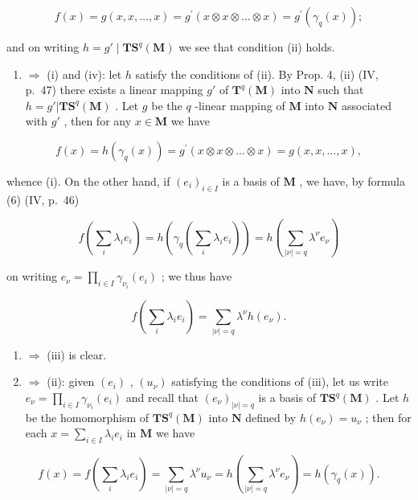\[
f (x) = g (x, x, \dots , x) = g ^ {\prime} (x \otimes x \otimes \dots \otimes x) = g ^ {\prime} (\gamma_ {q} (x));
\]

and on writing \(h = g' \mid \mathbf{TS}^q(\mathbf{M})\) we see that condition (ii) holds.

\begin{enumerate}
\def\labelenumi{(\roman{enumi})}
\setcounter{enumi}{1}
\tightlist
\item
  \(\Rightarrow\) (i) and (iv): let \(h\) satisfy the conditions of (ii). By Prop. 4, (ii) (IV, p.~47) there exists a linear mapping \(g'\) of \(\mathbf{T}^q (\mathbf{M})\) into \(\mathbf{N}\) such that \(h = g'|\mathbf{TS}^q (\mathbf{M})\) . Let \(g\) be the \(q\) -linear mapping of \(\mathbf{M}\) into \(\mathbf{N}\) associated with \(g'\) , then for any \(x\in \mathbf{M}\) we have
\end{enumerate}

\[
f (x) = h \left(\gamma_ {q} (x)\right) = g ^ {\prime} (x \otimes x \otimes \dots \otimes x) = g (x, x, \dots , x),
\]

whence (i). On the other hand, if \((e_i)_{i\in I}\) is a basis of \(\mathbf{M}\) , we have, by formula (6) (IV, p.~46)

\[
f \left(\sum_ {i} \lambda_ {i} e _ {i}\right) = h \left(\gamma_ {q} \left(\sum_ {i} \lambda_ {i} e _ {i}\right)\right) = h \left(\sum_ {| \nu | = q} \lambda^ {\nu} e _ {\nu}\right)
\]

on writing \(e_{\nu} = \prod_{i\in I}\gamma_{\nu_i}(e_i)\) ; we thus have

\[
f \left(\sum_ {i} \lambda_ {i} e _ {i}\right) = \sum_ {| \nu | = q} \lambda^ {\nu} h \left(e _ {\nu}\right).
\]

\begin{enumerate}
\def\labelenumi{(\roman{enumi})}
\setcounter{enumi}{3}
\item
  \(\Rightarrow\) (iii) is clear.
\item
  \(\Rightarrow\) (ii): given \((e_i)\) , \((u_\nu)\) satisfying the conditions of (iii), let us write \(e_\nu = \prod_{i\in I}\gamma_{\nu_i}(e_i)\) and recall that \((e_\nu)_{|\nu| = q}\) is a basis of \(\mathbf{TS}^q (\mathbf{M})\) . Let \(h\) be the homomorphism of \(\mathbf{TS}^q (\mathbf{M})\) into \(\mathbf{N}\) defined by \(h(e_{\nu}) = u_{\nu}\) ; then for each \(x = \sum_{i\in I}\lambda_i e_i\) in \(\mathbf{M}\) we have
\end{enumerate}

\[
f (x) = f \left(\sum_ {i} \lambda_ {i} e _ {i}\right) = \sum_ {| \nu | = q} \lambda^ {\nu} u _ {\nu} = h \left(\sum_ {| \nu | = q} \lambda^ {\nu} e _ {\nu}\right) = h (\gamma_ {q} (x)).
\]

